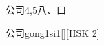 \begin{entry}{公司}{4,5}{⼋、⼝}
  \begin{phonetics}{公司}{gong1si1}[][HSK 2]
  \end{phonetics}
\end{entry}
